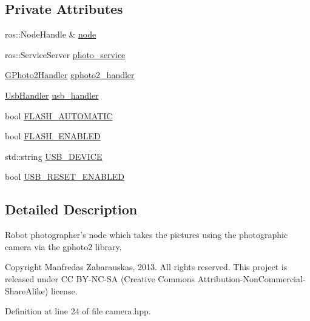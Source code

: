 \subsection*{\-Private \-Attributes}
\begin{DoxyCompactItemize}
\item 
ros\-::\-Node\-Handle \& \hyperlink{class_r_p_camera_node_a258bd2f067f146b88e9f7463f3ef9f3d}{node}
\item 
ros\-::\-Service\-Server \hyperlink{class_r_p_camera_node_ac8cd380063cf5cc9db19a74845e3f008}{photo\-\_\-service}
\item 
\hyperlink{class_g_photo2_handler}{\-G\-Photo2\-Handler} \hyperlink{class_r_p_camera_node_a15ea1a7dedfc8bca967f1dfd67dc544f}{gphoto2\-\_\-handler}
\item 
\hyperlink{class_usb_handler}{\-Usb\-Handler} \hyperlink{class_r_p_camera_node_aba586a055ce660b850a578150aae1eb7}{usb\-\_\-handler}
\item 
bool \hyperlink{class_r_p_camera_node_ad7b447a8e9d4de116d8407da10750a93}{\-F\-L\-A\-S\-H\-\_\-\-A\-U\-T\-O\-M\-A\-T\-I\-C}
\item 
bool \hyperlink{class_r_p_camera_node_af56a202a81ef4884fb5ce455bb288f42}{\-F\-L\-A\-S\-H\-\_\-\-E\-N\-A\-B\-L\-E\-D}
\item 
std\-::string \hyperlink{class_r_p_camera_node_a5d6be82d1ecbd5cd8dab19c863c8df05}{\-U\-S\-B\-\_\-\-D\-E\-V\-I\-C\-E}
\item 
bool \hyperlink{class_r_p_camera_node_a48ca485f3692b562413f1be1c6fa4952}{\-U\-S\-B\-\_\-\-R\-E\-S\-E\-T\-\_\-\-E\-N\-A\-B\-L\-E\-D}
\end{DoxyCompactItemize}


\subsection{\-Detailed \-Description}
\-Robot photographer's node which takes the pictures using the photographic camera via the gphoto2 library. 

\begin{DoxyCopyright}{\-Copyright}
\-Manfredas \-Zabarauskas, 2013. \-All rights reserved. \-This project is released under \-C\-C \-B\-Y-\/\-N\-C-\/\-S\-A (\-Creative \-Commons \-Attribution-\/\-Non\-Commercial-\/\-Share\-Alike) license. 
\end{DoxyCopyright}


\-Definition at line 24 of file camera.\-hpp.



